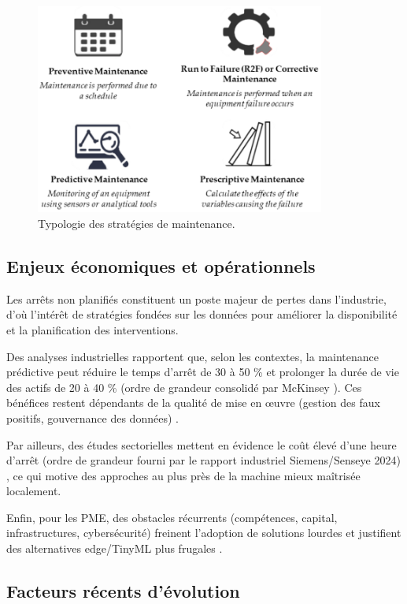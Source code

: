 \begin{figure}[h]
\centering
\includegraphics[width=0.85\textwidth]{images/maintaince-types.png}
\caption{Typologie des stratégies de maintenance.}
\label{fig:maintenance_types}
\end{figure}

\subsection{Enjeux économiques et opérationnels}

Les arrêts non planifiés constituent un poste majeur de pertes dans l'industrie, d'où l'intérêt de stratégies fondées sur les données pour améliorer la disponibilité et la planification des interventions.

Des analyses industrielles rapportent que, selon les contextes, la maintenance prédictive peut réduire le temps d'arrêt de 30 à 50 \% et prolonger la durée de vie des actifs de 20 à 40 \% (ordre de grandeur consolidé par McKinsey \cite{mckinsey2017}). Ces bénéfices restent dépendants de la qualité de mise en œuvre (gestion des faux positifs, gouvernance des données) \cite{mckinsey2021}.

Par ailleurs, des études sectorielles mettent en évidence le coût élevé d'une heure d'arrêt (ordre de grandeur fourni par le rapport industriel Siemens/Senseye 2024) \cite{siemens2024}, ce qui motive des approches au plus près de la machine mieux maîtrisée localement.

Enfin, pour les PME, des obstacles récurrents (compétences, capital, infrastructures, cybersécurité) freinent l'adoption de solutions lourdes et justifient des alternatives edge/TinyML plus frugales \cite{oecd2021}.

\subsection{Facteurs récents d'évolution}

